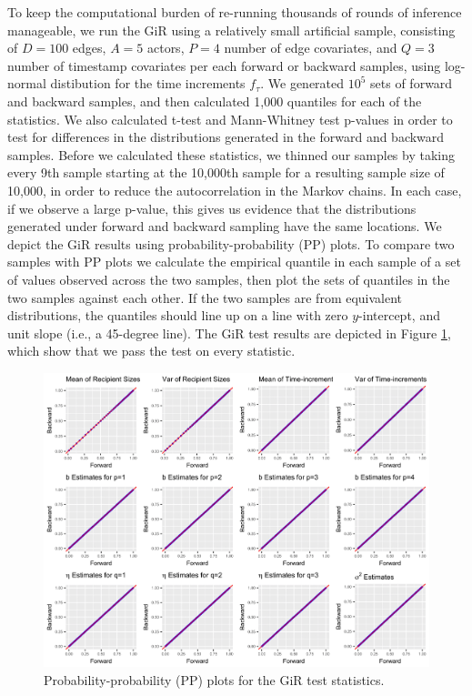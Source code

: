 \documentclass[ba]{imsart}
\numberwithin{equation}{section}
\theoremstyle{plain}
\begin{document}
   To keep the computational burden of re-running thousands of rounds of inference manageable, we run the GiR using a relatively small artificial sample, consisting of $D=100$ edges, $A=5$ actors, $P=4$ number of edge covariates, and $Q=3$ number of timestamp covariates per each forward or backward samples, using log-normal distibution for the time increments $f_\tau$. We generated $10^5$ sets of forward and backward samples, and then calculated 1,000 quantiles for each of the statistics. We also calculated t-test and Mann-Whitney test p-values in order to test for differences in the distributions generated in the forward and backward samples. Before we calculated these statistics, we thinned our samples by taking every 9th sample starting at the 10,000th sample for a resulting sample size of 10,000, in order to reduce the autocorrelation in the Markov chains. In each case, if we observe a large p-value, this gives us evidence that the distributions generated under forward and backward sampling have the same locations. We depict the GiR results using probability-probability (PP) plots. To compare two samples with PP plots we calculate the empirical quantile in each sample of a set of values observed across the two samples, then plot the sets of quantiles in the two samples against each other. If the two samples are from equivalent distributions, the quantiles should line up on a line with zero $y$-intercept, and unit slope (i.e., a 45-degree line). The GiR test results are depicted in Figure \ref{figure:GiRplot}, which show that we pass the test on every statistic.
   \begin{figure}[ht]
   	\centering
   	\includegraphics[width=1\textwidth]{img/GiRplot-1.png}	
   	\caption{Probability-probability (PP) plots for the GiR test statistics.}
   	   	\label{figure:GiRplot}
   \end{figure}
\end{document}
